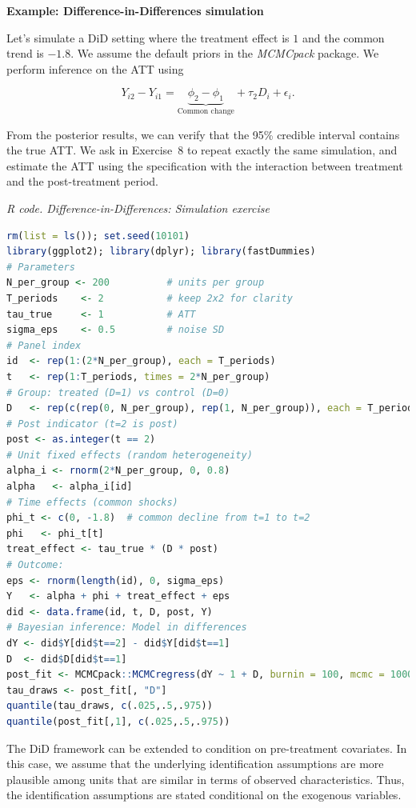 \textbf{Example: Difference-in-Differences simulation}

Let's simulate a DiD setting where the treatment effect is $1$ and the common trend is $-1.8$. We assume the default priors in the \textit{MCMCpack} package. We perform inference on the ATT using

\[
Y_{i2} - Y_{i1}
= \underbrace{\phi_2 - \phi_1}_{\text{Common change}}
+ \tau_2 D_i + \epsilon_i.
\]

From the posterior results, we can verify that the 95\% credible interval contains the true ATT. We ask in Exercise~8 to repeat exactly the same simulation, and estimate the ATT using the specification with the interaction between treatment and the post-treatment period.

\begin{tcolorbox}[enhanced,width=4.67in,center upper,
	fontupper=\large\bfseries,drop shadow southwest,sharp corners]
	\textit{R code. Difference-in-Differences: Simulation exercise}
	\begin{VF}
		\begin{lstlisting}[language=R]		
rm(list = ls()); set.seed(10101)
library(ggplot2); library(dplyr); library(fastDummies)
# Parameters
N_per_group <- 200          # units per group
T_periods    <- 2           # keep 2x2 for clarity
tau_true     <- 1           # ATT
sigma_eps    <- 0.5         # noise SD
# Panel index
id  <- rep(1:(2*N_per_group), each = T_periods)
t   <- rep(1:T_periods, times = 2*N_per_group)
# Group: treated (D=1) vs control (D=0)
D   <- rep(c(rep(0, N_per_group), rep(1, N_per_group)), each = T_periods)
# Post indicator (t=2 is post)
post <- as.integer(t == 2)
# Unit fixed effects (random heterogeneity)
alpha_i <- rnorm(2*N_per_group, 0, 0.8)
alpha   <- alpha_i[id]
# Time effects (common shocks)
phi_t <- c(0, -1.8)  # common decline from t=1 to t=2
phi   <- phi_t[t]
treat_effect <- tau_true * (D * post)
# Outcome:
eps <- rnorm(length(id), 0, sigma_eps)
Y   <- alpha + phi + treat_effect + eps
did <- data.frame(id, t, D, post, Y)
# Bayesian inference: Model in differences
dY <- did$Y[did$t==2] - did$Y[did$t==1]
D  <- did$D[did$t==1]
post_fit <- MCMCpack::MCMCregress(dY ~ 1 + D, burnin = 100, mcmc = 1000)
tau_draws <- post_fit[, "D"]
quantile(tau_draws, c(.025,.5,.975))
quantile(post_fit[,1], c(.025,.5,.975))
\end{lstlisting}
	\end{VF}
\end{tcolorbox}  
 

The DiD framework can be extended to condition on pre-treatment covariates. In this case, we assume that the underlying identification assumptions are more plausible among units that are similar in terms of observed characteristics. Thus, the identification assumptions are stated conditional on the exogenous variables.

